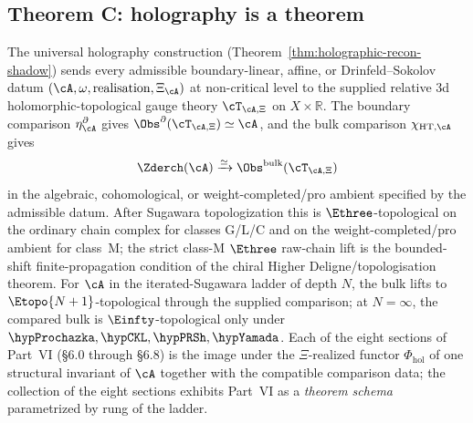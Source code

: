 \subsection{Theorem C: holography is a theorem}
\label{sec:part-vi-theorem-C}

\begin{theorem}
\label{thm:part-vi-holography-is-a-theorem}
The universal holography construction
(Theorem~\ref{thm:holographic-recon-shadow}) sends every admissible
boundary-linear, affine, or Drinfeld--Sokolov datum
$(\cA,\omega,\mathrm{realisation},\Xi_\cA)$ at non-critical level to
the supplied relative 3d holomorphic-topological gauge theory
\(\cT_{\cA,\Xi}\) on \(X \times \mathbb{R}\). The boundary comparison
\(\eta^\partial_\cA\) gives
\(\Obs^\partial(\cT_{\cA,\Xi}) \simeq \cA\), and the bulk comparison
\(\chi_{\mathrm{HT},\cA}\) gives
\[
\Zderch(\cA)\xrightarrow{\simeq}
\Obs^{\mathrm{bulk}}(\cT_{\cA,\Xi})
\]
in the algebraic, cohomological, or weight-completed/pro ambient
specified by the admissible datum. After Sugawara topologization this is
$\Ethree$-topological on the ordinary chain complex for classes G/L/C
and on the weight-completed/pro ambient for class~M; the strict class-M
$\Ethree$ raw-chain lift is the bounded-shift finite-propagation
condition of the chiral Higher Deligne/topologisation theorem. For
$\cA$ in the
iterated-Sugawara ladder of depth $N$, the bulk lifts to
$\Etopo{N+1}$-topological through the supplied comparison; at
$N = \infty$, the compared bulk is $\Einfty$-topological only under
\(\hypProchazka,\hypCKL,\hypPRSh,\hypYamada\). Each of the
eight sections of Part~VI
\textup{(}\S6.0 through \S6.8\textup{)} is the image under the
\(\Xi\)-realized functor \(\Phi_{\mathrm{hol}}\) of one structural
invariant of $\cA$ together with the compatible comparison data; the
collection of the eight sections exhibits Part~VI as a \emph{theorem
schema} parametrized by rung of the ladder.
\end{theorem}
